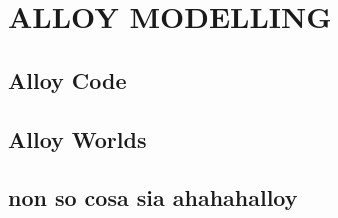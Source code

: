 
\section{ALLOY MODELLING} 
\subsection{Alloy Code}
\subsection{Alloy Worlds}
\subsection{non so cosa sia ahahahalloy}